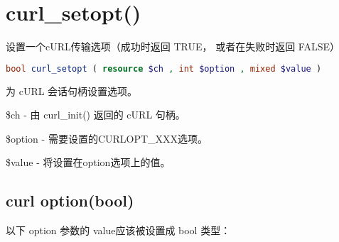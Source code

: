 \section{curl\_setopt()}




设置一个cURL传输选项（成功时返回 TRUE， 或者在失败时返回 FALSE）


\begin{lstlisting}[language=PHP]
bool curl_setopt ( resource $ch , int $option , mixed $value )
\end{lstlisting}

为 cURL 会话句柄设置选项。

\begin{compactitem}
\item \$ch - 由 curl\_init() 返回的 cURL 句柄。

\item \$option - 需要设置的CURLOPT\_XXX选项。

\item \$value - 将设置在option选项上的值。

\end{compactitem}

\subsection{curl option(bool)}

以下 option 参数的 value应该被设置成 bool 类型：

